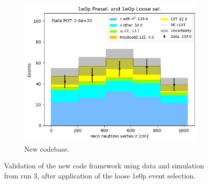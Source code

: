 \begin{figure}[H]
\begin{subfigure}[t]{0.32\linewidth}
        \includegraphics[width=\linewidth]{technote/Appendix_Validation/Figures/1e0p_Loose/Run3_Vertex_Z_Alex.png}
        \caption{New codebase.}
    \end{subfigure}
    \caption{Validation of the new code framework using data and simulation from run 3, after application of the loose 1e0p event selection.}
\end{figure}




